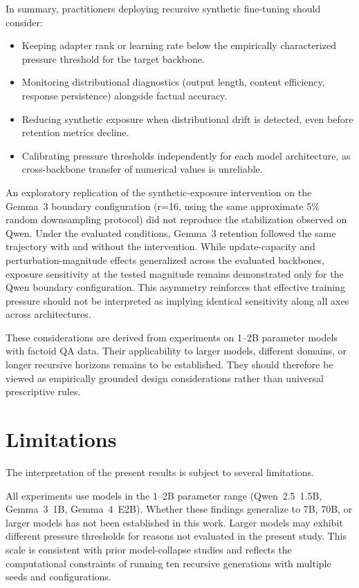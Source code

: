 \documentclass[a4paper,fleqn]{cas-dc}
\begin{document}
In summary, practitioners deploying recursive synthetic fine-tuning should
consider:
\begin{itemize}
    \item Keeping adapter rank or learning rate below the empirically
    characterized pressure threshold for the target backbone.
    \item Monitoring distributional diagnostics (output length, content
    efficiency, response persistence) alongside factual accuracy.
    \item Reducing synthetic exposure when distributional drift is detected,
    even before retention metrics decline.
    \item Calibrating pressure thresholds independently for each model
    architecture, as cross-backbone transfer of numerical values is unreliable.
\end{itemize}

An exploratory replication of the synthetic-exposure intervention on the
Gemma~3 boundary configuration (r=16, using the same approximate 5\% random
downsampling protocol) did not reproduce the stabilization observed on Qwen.
Under the evaluated conditions, Gemma~3 retention followed the same
trajectory with and without the intervention. While update-capacity and
perturbation-magnitude effects generalized across the evaluated backbones,
exposure sensitivity at the tested magnitude remains demonstrated only for
the Qwen boundary configuration. This asymmetry reinforces that effective
training pressure should not be interpreted as implying identical sensitivity
along all axes across architectures.

These considerations are derived from experiments on 1--2B parameter models with
factoid QA data. Their applicability to larger models, different domains, or
longer recursive horizons remains to be established. They should therefore be
viewed as empirically grounded design considerations rather than universal
prescriptive rules.

\section{Limitations}\label{sec:limitations}

The interpretation of the present results is subject to several limitations.

All experiments use models in the 1--2B parameter range (Qwen~2.5~1.5B,
Gemma~3~1B, Gemma~4~E2B). Whether these findings generalize to 7B, 70B, or
larger models has not been established in this work. Larger models may exhibit
different pressure thresholds for reasons not evaluated in the present study.
This scale is consistent with prior model-collapse studies
\citep{shumailov2024,keisha2025} and reflects the computational constraints of
running ten recursive generations with multiple seeds and configurations.
\end{document}
